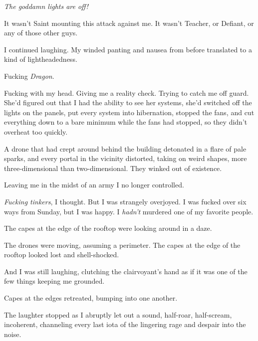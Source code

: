 \emph{The goddamn lights are off!}



It wasn't Saint mounting this attack against me.  It wasn't Teacher, or Defiant, or any of those other guys.



I continued laughing.  My winded panting and nausea from before translated to a kind of lightheadedness.



Fucking \emph{Dragon}.



Fucking with my head.  Giving me a reality check.  Trying to catch me off guard.  She'd figured out that I had the ability to see her systems, she'd switched off the lights on the panels, put every system into hibernation, stopped the fans, and cut everything down to a bare minimum while the fans had stopped, so they didn't overheat too quickly.



A drone that had crept around behind the building detonated in a flare of pale sparks, and every portal in the vicinity distorted, taking on weird shapes, more three-dimensional than two-dimensional.  They winked out of existence.



Leaving me in the midst of an army I no longer controlled.



\emph{Fucking tinkers}, I thought.  But I was strangely overjoyed.  I was fucked over six ways from Sunday, but I was happy.  I \emph{hadn't} murdered one of my favorite people.



The capes at the edge of the rooftop were looking around in a daze.



The drones were moving, assuming a perimeter.  The capes at the edge of the rooftop looked lost and shell-shocked.



And I was still laughing, clutching the clairvoyant's hand as if it was one of the few things keeping me grounded.



Capes at the edges retreated, bumping into one another.



The laughter stopped as I abruptly let out a sound, half-roar, half-scream, incoherent, channeling every last iota of the lingering rage and despair into the noise.



